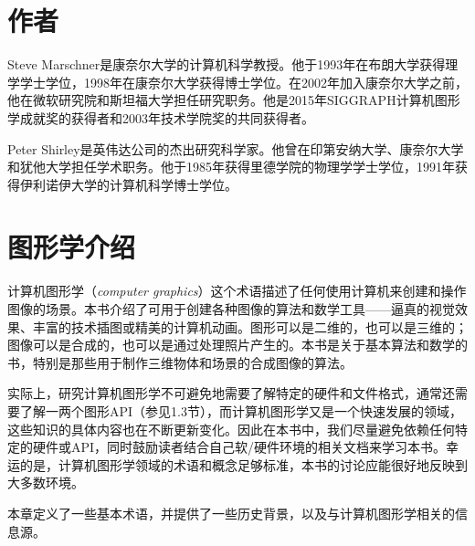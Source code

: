 \documentclass[lang=cn,12pt,marginpar=margintrue]{elegantbook}
\begin{document}



\vspace*{-1em}

\chapter{作者}

Steve Marschner是康奈尔大学的计算机科学教授。他于1993年在布朗大学获得理学学士学位，1998年在康奈尔大学获得博士学位。在2002年加入康奈尔大学之前，他在微软研究院和斯坦福大学担任研究职务。他是2015年SIGGRAPH计算机图形学成就奖的获得者和2003年技术学院奖的共同获得者。

Peter Shirley是英伟达公司的杰出研究科学家。他曾在印第安纳大学、康奈尔大学和犹他大学担任学术职务。他于1985年获得里德学院的物理学学士学位，1991年获得伊利诺伊大学的计算机科学博士学位。

\tableofcontents

\mainmatter

\chapter{图形学介绍}

计算机图形学（\textit{computer graphics}）这个术语描述了任何使用计算机来创建和操作图像的场景。本书介绍了可用于创建各种图像的算法和数学工具——逼真的视觉效果、丰富的技术插图或精美的计算机动画。图形可以是二维的，也可以是三维的；图像可以是合成的，也可以是通过处理照片产生的。本书是关于基本算法和数学的书，特别是那些用于制作三维物体和场景的合成图像的算法。

实际上，研究计算机图形学不可避免地需要了解特定的硬件和文件格式，通常还需要了解一两个图形API（参见1.3节），而计算机图形学又是一个快速发展的领域，这些知识的具体内容也在不断更新变化。因此在本书中，我们尽量避免依赖任何特定的硬件或API，同时鼓励读者结合自己软/硬件环境的相关文档来学习本书。幸运的是，计算机图形学领域的术语和概念足够标准，本书的讨论应能很好地反映到大多数环境。


本章定义了一些基本术语，并提供了一些历史背景，以及与计算机图形学相关的信息源。
\end{document}
